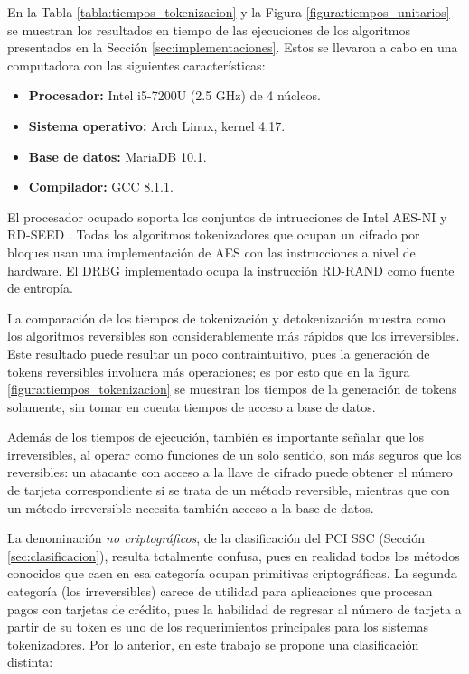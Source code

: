 
En la Tabla \ref{tabla:tiempos_tokenizacion} y la Figura
\ref{figura:tiempos_unitarios} se muestran los resultados en tiempo de
las ejecuciones de los algoritmos presentados en la Sección
\ref{sec:implementaciones}. Estos se llevaron a cabo en una computadora con las
siguientes características:

\begin{itemize}
  \item \textbf{Procesador:} Intel i5-7200U (2.5 GHz) de 4 núcleos.
  \item \textbf{Sistema operativo:} Arch Linux, kernel 4.17.
  \item \textbf{Base de datos:} MariaDB 10.1.
  \item \textbf{Compilador:} GCC 8.1.1.
\end{itemize}

El procesador ocupado soporta los conjuntos de intrucciones de Intel AES-NI y
RD-SEED \cite{aesni_wp}. Todas los algoritmos tokenizadores que ocupan un
cifrado por bloques usan una implementación de AES con las instrucciones a nivel
de hardware. El DRBG implementado ocupa la instrucción RD-RAND como fuente de
entropía.


La comparación de los tiempos de tokenización y detokenización muestra como los
algoritmos reversibles son considerablemente más rápidos que los irreversibles.
Este resultado puede resultar un poco contraintuitivo, pues la generación de
tokens reversibles involucra más operaciones; es por esto que en la figura
\ref{figura:tiempos_tokenizacion} se muestran los tiempos de la generación de
tokens solamente, sin tomar en cuenta tiempos de acceso a base de datos.

Además de los tiempos de ejecución, también es importante señalar que los
irreversibles, al operar como funciones de un solo sentido, son más
seguros que los reversibles: un atacante con acceso a la llave de cifrado puede
obtener el número de tarjeta correspondiente si se trata de un método
reversible, mientras que con un método irreversible necesita también acceso a la
base de datos.


La denominación \textit{no criptográficos}, de la clasificación del PCI SSC
(Sección \ref{sec:clasificacion}), resulta totalmente confusa, pues en
realidad todos los métodos conocidos que caen en esa categoría ocupan
primitivas criptográficas. La segunda categoría (los irreversibles) carece de
utilidad para aplicaciones que procesan pagos con tarjetas de crédito, pues la
habilidad de regresar al número de tarjeta a partir de su token es uno de los
requerimientos principales para los sistemas tokenizadores. Por lo anterior, en
este trabajo se propone una clasificación distinta:

